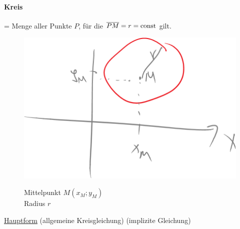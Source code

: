 \begin{enumerate}[A)]
	\paragraph{Kreis} = Menge aller Punkte $P$, für die $\overline{PM} = r = \text{const}$ gilt.
	\begin{figure}[h!]
		\begin{minipage}{5cm}
			\includegraphics[width=\linewidth]{Bilder/122}
			\caption{}
		\end{minipage}
		\quad
		\begin{minipage}{\linewidth-5cm - 1em}
			Mittelpunkt $M(x_M;y_M)$\\
			Radius $r$
		\end{minipage}
	\end{figure}
	
	\ul{Hauptform} (allgemeine Kreisgleichung)
	 \qquad (implizite Gleichung)
	

\end{enumerate}

